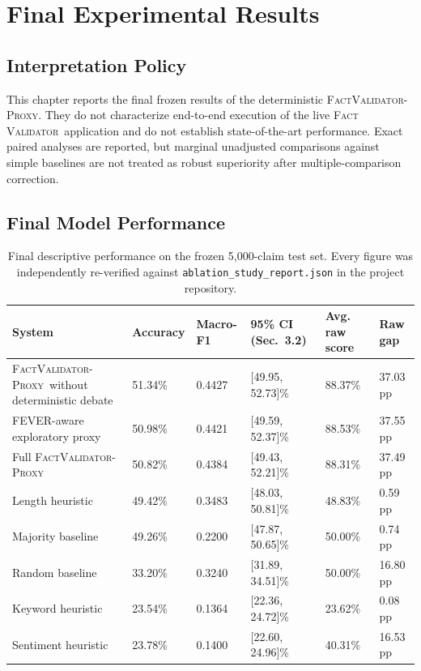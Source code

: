 \documentclass[12pt,a4paper,openany]{report}
\newcommand{\system}{\textsc{Fact Validator}}
\newcommand{\proxy}{\textsc{FactValidator-Proxy}}
\begin{document}
\chapter{Final Experimental Results}
\section{Interpretation Policy}
This chapter reports the final frozen results of the deterministic \proxy. They do not characterize end-to-end execution of the live \system\ application and do not establish state-of-the-art performance. Exact paired analyses are reported, but marginal unadjusted comparisons against simple baselines are not treated as robust superiority after multiple-comparison correction.

\section{Final Model Performance}
\begin{table}[H]
\centering
\caption{Final descriptive performance on the frozen 5{,}000-claim test set. Every figure was independently re-verified against \texttt{ablation\_study\_report.json} in the project repository.}
\label{tab:perf}
\small
\begin{tabularx}{\textwidth}{Xp{1.6cm}p{1.6cm}p{2.3cm}p{2.2cm}p{2cm}}
\toprule
System & Accuracy & Macro-F1 & 95\% CI (Sec.~3.2) & Avg. raw score & Raw gap \\
\midrule
\proxy\ without deterministic debate & 51.34\% & 0.4427 & [49.95, 52.73]\% & 88.37\% & 37.03 pp \\
FEVER-aware exploratory proxy & 50.98\% & 0.4421 & [49.59, 52.37]\% & 88.53\% & 37.55 pp \\
Full \proxy & 50.82\% & 0.4384 & [49.43, 52.21]\% & 88.31\% & 37.49 pp \\
Length heuristic & 49.42\% & 0.3483 & [48.03, 50.81]\% & 48.83\% & 0.59 pp \\
Majority baseline & 49.26\% & 0.2200 & [47.87, 50.65]\% & 50.00\% & 0.74 pp \\
Random baseline & 33.20\% & 0.3240 & [31.89, 34.51]\% & 50.00\% & 16.80 pp \\
Keyword heuristic & 23.54\% & 0.1364 & [22.36, 24.72]\% & 23.62\% & 0.08 pp \\
Sentiment heuristic & 23.78\% & 0.1400 & [22.60, 24.96]\% & 40.31\% & 16.53 pp \\
\bottomrule
\end{tabularx}
\end{table}
\end{document}

